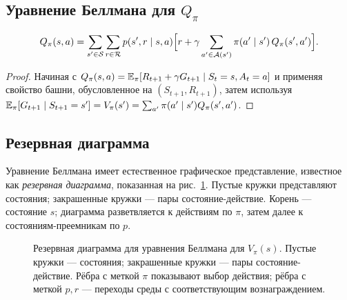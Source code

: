 \subsection*{Уравнение Беллмана для $Q_\pi$}

\begin{proposition}
\label{prop:bellman-q}
\begin{equation}
\label{eq:bellman-q}
Q_\pi(s, a)
= \sum_{s' \in \mathcal{S}} \sum_{r \in \mathcal{R}} p(s', r \mid s, a)
  \Bigl[r + \gamma \sum_{a' \in \mathcal{A}(s')} \pi(a' \mid s')\, Q_\pi(s', a')\Bigr].
\end{equation}
\end{proposition}

\begin{proof}
Начиная с $Q_\pi(s,a) = \operatorname{\mathbb{E}}_\pi[R_{t+1} + \gamma G_{t+1} \mid S_t=s, A_t=a]$ и применяя свойство башни, обусловленное на $(S_{t+1}, R_{t+1})$, затем используя $\operatorname{\mathbb{E}}_\pi[G_{t+1} \mid S_{t+1} = s'] = V_\pi(s') = \sum_{a'} \pi(a' \mid s') Q_\pi(s', a')$.
\end{proof}

\subsection*{Резервная диаграмма}

Уравнение Беллмана имеет естественное графическое представление, известное как \emph{резервная диаграмма}, показанная на рис.~\ref{fig:backup-v}. Пустые кружки представляют состояния; закрашенные кружки — пары состояние-действие. Корень — состояние $s$; диаграмма разветвляется к действиям по $\pi$, затем далее к состояниям-преемникам по $p$.

\begin{figure}[ht]
\centering
{}
\caption{Резервная диаграмма для уравнения Беллмана для $V_\pi(s)$. Пустые кружки — состояния; закрашенные кружки — пары состояние-действие. Рёбра с меткой $\pi$ показывают выбор действия; рёбра с меткой $p,r$ — переходы среды с соответствующим вознаграждением.}
\label{fig:backup-v}
\end{figure}

